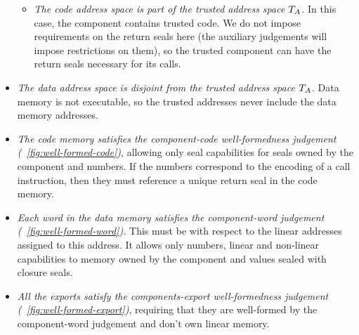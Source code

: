 \documentclass{jfp}
\newenvironment{jversion}{}{}
\begin{document}
\begin{jversion}
\begin{itemize}
\begin{itemize}
  \item \textit{The code address space is part of the trusted address space $T_{A}$.} In this case, the component contains trusted code. We do not impose requirements on the return seals here (the auxiliary judgements will impose restrictions on them), so the trusted component can have the return seals necessary for its calls.
  \end{itemize}
\item \emph{The data address space is disjoint from the trusted address space $T_{A}$.} Data memory is not executable, so the trusted addresses never include the data memory addresses.
\item \textit{The code memory satisfies the component-code well-formedness judgement (\figurename~\ref{fig:well-formed-code})}, allowing only seal capabilities for seals owned by the component and numbers. If the numbers correspond to the encoding of a call instruction, then they must reference a unique return seal in the code memory.
\item \textit{Each word in the data memory satisfies the component-word judgement (\figurename~\ref{fig:well-formed-word}).} This must be with respect to the linear addresses assigned to this address. It allows only numbers, linear and non-linear capabilities to memory owned by the component and values sealed with closure seals.
\item \textit{All the exports satisfy the components-export well-formedness judgement (\figurename~\ref{fig:well-formed-export})}, requiring that they are well-formed by the component-word judgement and don't own linear memory.
\end{itemize}


\end{jversion}
\end{document}
